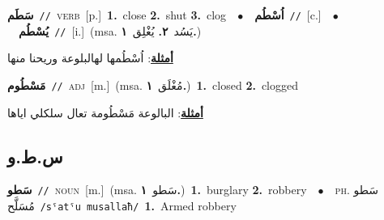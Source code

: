 \documentclass[10pt,a4paper,twoside]{article} %
\begin{document}
\begin{multicols}{2}
{\setlength\topsep{0pt}\textbf{\foreignlanguage{arabic}{سَطَم}}\ {\color{gray}\texttt{//}\color{black}}\ \textsc{verb}\ [p.]\ \textbf{1.}~close  \textbf{2.}~shut  \textbf{3.}~clog\ \ $\bullet$\ \ \setlength\topsep{0pt}\textbf{\foreignlanguage{arabic}{اُسْطُم}}\ {\color{gray}\texttt{//}\color{black}}\ [c.]\ \ $\bullet$\ \ \setlength\topsep{0pt}\textbf{\foreignlanguage{arabic}{يُسْطُم}}\ {\color{gray}\texttt{//}\color{black}}\ [i.]\ \color{gray}(msa. \foreignlanguage{arabic}{يَسُد}~\foreignlanguage{arabic}{\textbf{٢.}}  \foreignlanguage{arabic}{يُغْلِق}~\foreignlanguage{arabic}{\textbf{١.}})\color{black}\  \begin{flushright}\color{gray}\foreignlanguage{arabic}{\textbf{\underline{\foreignlanguage{arabic}{أمثلة}}}: اُسْطُمها لهالبلوعة وريحنا منها}\end{flushright}\color{black}} \vspace{2mm}

{\setlength\topsep{0pt}\textbf{\foreignlanguage{arabic}{مَسْطُوم}}\ {\color{gray}\texttt{//}\color{black}}\ \textsc{adj}\ [m.]\ \color{gray}(msa. \foreignlanguage{arabic}{مُغْلَق}~\foreignlanguage{arabic}{\textbf{١.}})\color{black}\ \textbf{1.}~closed  \textbf{2.}~clogged\  \begin{flushright}\color{gray}\foreignlanguage{arabic}{\textbf{\underline{\foreignlanguage{arabic}{أمثلة}}}: البالوعة مَسْطُومة تعال سلكلي اياها}\end{flushright}\color{black}} \vspace{2mm}

\vspace{-3mm}
\subsection*{\color{blue}\foreignlanguage{arabic}{س.ط.و}\color{blue}{}} 

{\setlength\topsep{0pt}\textbf{\foreignlanguage{arabic}{سَطو}}\ {\color{gray}\texttt{//}\color{black}}\ \textsc{noun}\ [m.]\ \color{gray}(msa. \foreignlanguage{arabic}{سَطو}~\foreignlanguage{arabic}{\textbf{١.}})\color{black}\ \textbf{1.}~burglary  \textbf{2.}~robbery\ \ $\bullet$\ \ \textsc{ph.} \color{gray} \foreignlanguage{arabic}{سَطو مُسَلَّح}\color{black}\ {\color{gray}\texttt{/{\sffamily sˤatˤu musallaħ}/}\color{black}}\ \textbf{1.}~Armed robbery\ } \vspace{2mm}


\end{multicols}
\end{document}
